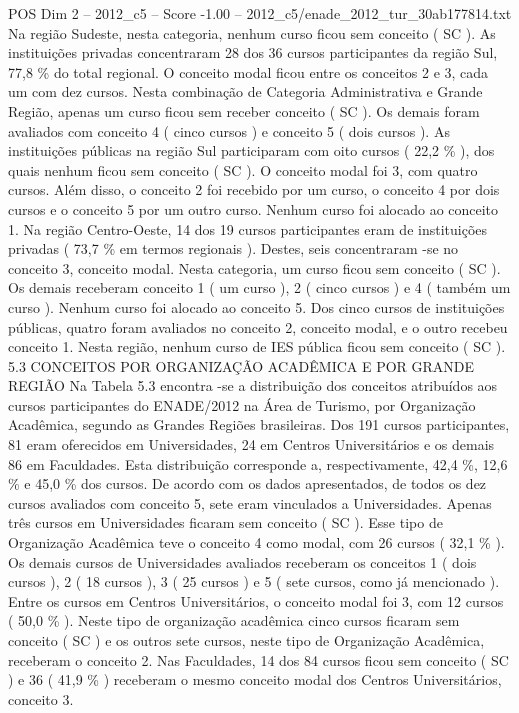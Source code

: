 \begin{textsample}{POS Dim 2 – 2012\_c5 – Score -1.00 – 2012\_c5/enade\_2012\_tur\_30ab177814.txt}
Na região Sudeste, nesta categoria, nenhum curso ficou sem conceito ( SC ).
As instituições privadas concentraram 28 dos 36 cursos participantes da região Sul, 77,8 \% do total regional.
O conceito modal ficou entre os conceitos 2 e 3, cada um com dez cursos.
Nesta combinação de Categoria Administrativa e Grande Região, apenas um curso ficou sem receber conceito ( SC ).
Os demais foram avaliados com conceito 4 ( cinco cursos ) e conceito 5 ( dois cursos ).
As instituições públicas na região Sul participaram com oito cursos ( 22,2 \% ), dos quais nenhum ficou sem conceito ( SC ).
O conceito modal foi 3, com quatro cursos.
Além disso, o conceito 2 foi recebido por um curso, o conceito 4 por dois cursos e o conceito 5 por um outro curso.
Nenhum curso foi alocado ao conceito 1.
Na região Centro-Oeste, 14 dos 19 cursos participantes eram de instituições privadas ( 73,7 \% em termos regionais ).
Destes, seis concentraram -se no conceito 3, conceito modal.
Nesta categoria, um curso ficou sem conceito ( SC ).
Os demais receberam conceito 1 ( um curso ), 2 ( cinco cursos ) e 4 ( também um curso ).
Nenhum curso foi alocado ao conceito 5.
Dos cinco cursos de instituições públicas, quatro foram avaliados no conceito 2, conceito modal, e o outro recebeu conceito 1.
Nesta região, nenhum curso de IES pública ficou sem conceito ( SC ). 5.3 CONCEITOS POR ORGANIZAÇÃO ACADÊMICA E POR GRANDE REGIÃO Na Tabela 5.3 encontra -se a distribuição dos conceitos atribuídos aos cursos participantes do ENADE/2012 na Área de Turismo, por Organização Acadêmica, segundo as Grandes Regiões brasileiras.
Dos 191 cursos participantes, 81 eram oferecidos em Universidades, 24 em Centros Universitários e os demais 86 em Faculdades.
Esta distribuição corresponde a, respectivamente, 42,4 \%, 12,6 \% e 45,0 \% dos cursos.
De acordo com os dados apresentados, de todos os dez cursos avaliados com conceito 5, sete eram vinculados a Universidades.
Apenas três cursos em Universidades ficaram sem conceito ( SC ).
Esse tipo de Organização Acadêmica teve o conceito 4 como modal, com 26 cursos ( 32,1 \% ).
Os demais cursos de Universidades avaliados receberam os conceitos 1 ( dois cursos ), 2 ( 18 cursos ), 3 ( 25 cursos ) e 5 ( sete cursos, como já mencionado ).
Entre os cursos em Centros Universitários, o conceito modal foi 3, com 12 cursos ( 50,0 \% ).
Neste tipo de organização acadêmica cinco cursos ficaram sem conceito ( SC ) e os outros sete cursos, neste tipo de Organização Acadêmica, receberam o conceito 2.
Nas Faculdades, 14 dos 84 cursos ficou sem conceito ( SC ) e 36 ( 41,9 \% ) receberam o mesmo conceito modal dos Centros Universitários, conceito 3.

\end{textsample}
